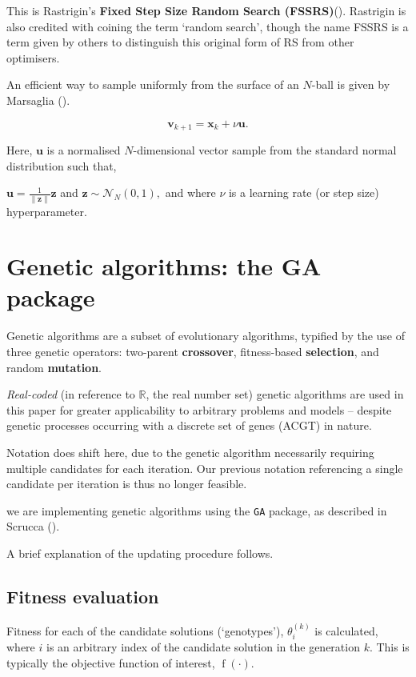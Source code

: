 \documentclass[
  a4paper,
]{article}
\newcommand{\B}[1]{\boldsymbol{#1}}
\newcommand{\+}{\phantom{-}}
\newcommand{\op}[2]{\operatorname{#1}\left(#2\right)}
\begin{document}
This is Rastrigin's \textbf{Fixed Step Size Random Search
(FSSRS)}(). Rastrigin is
also credited with coining the term `random search', though the name
FSSRS is a term given by others to distinguish this original form of RS
from other optimisers.

An efficient way to sample uniformly from the surface of an \(N\)-ball
is given by Marsaglia ().

\[\B v_{k+1} = \B x_k +\nu \B u.\]

Here, \(\B u\) is a normalised \(N\)-dimensional vector sample from the
standard normal distribution such that,

\(\B u = \frac1{\lVert \B z \rVert}\B z\) and
\(\B z \sim \mathcal{N}_N\left(0,1\right),\) and where \(\nu\) is a
learning rate (or step size) hyperparameter.

\section{Genetic algorithms: the GA
package}\label{genetic-algorithms-the-ga-package}

Genetic algorithms are a subset of evolutionary algorithms, typified by
the use of three genetic operators: two-parent \textbf{crossover},
fitness-based \textbf{selection}, and random \textbf{mutation}.

\emph{Real-coded} (in reference to \(\mathbb R\), the real number set)
genetic algorithms are used in this paper for greater applicability to
arbitrary problems and models -- despite genetic processes occurring
with a discrete set of genes (ACGT) in nature.

Notation does shift here, due to the genetic algorithm necessarily
requiring multiple candidates for each iteration. Our previous notation
referencing a single candidate per iteration is thus no longer feasible.

we are implementing genetic algorithms using the \texttt{GA} package, as
described in Scrucca ().

A brief explanation of the updating procedure follows.

\subsection{\texorpdfstring{\textbf{Fitness
evaluation}}{Fitness evaluation}}\label{fitness-evaluation}

Fitness for each of the candidate solutions (`genotypes'),
\(\theta_i^{\left(k\right)}\) is calculated, where \(i\) is an arbitrary
index of the candidate solution in the generation \(k\). This is
typically the objective function of interest, \(\op f{\cdot}\).
\end{document}

